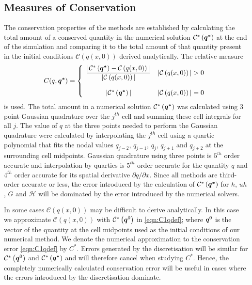 \subsection{Measures of Conservation}
The conservation properties of the methods are established by calculating the total amount of a conserved quantity in the numerical solution $\mathcal{C}^*\left({\boldsymbol{q^*}}\right)$ at the end of the simulation and comparing it to the total amount of that quantity present in the initial conditions $\mathcal{C}\left({q(x,0)} \right)$ derived analytically. The relative measure
\begin{equation}
C(q,\boldsymbol{q^*}) =  \left\lbrace \begin{array}{c r} 
\dfrac{|\mathcal{C}^*\left({\boldsymbol{q^*}}\right) - \mathcal{C}\left({q(x,0)} \right)| }{|\mathcal{C}\left({q(x,0)} \right)|} & |\mathcal{C}\left({q(x,0)} \right)| > 0 \\ \\
|\mathcal{C}^*\left({\boldsymbol{q^*}}\right)| & |\mathcal{C}\left({q(x,0)} \right)| = 0  \end{array}\right. 
\label{eqn:C1qdef} 
\end{equation}
is used. The total amount in a numerical solution $\mathcal{C}^*\left({\boldsymbol{q^*}}\right)$ was calculated using 3 point Gaussian quadrature over the $j^{th}$ cell and summing these cell integrals for all $j$. The value of $q$ at the three points needed to perform the Gaussian quadrature were calculated by interpolating the $j^{th}$ cell using a quartic polynomial that fits the nodal values $q_{j-2}$, $q_{j-1}$, $q_{j}$, $q_{j+1}$ and $q_{j+2}$ at the surrounding cell midpoints. Gaussian quadrature using three points is $5^{th}$ order accurate and interpolation by quartics is $5^{th}$ order accurate for the quantity $q$ and $4^{th}$ order accurate for its spatial derivative $\partial q / \partial x$. Since all methods are third-order accurate or less, the error introduced by the calculation of $\mathcal{C}^*\left({\boldsymbol{q^*}}\right)$ for $h$, $uh$, $G$ and $\mathcal{H}$ will be dominated by the error introduced by the numerical solvers.

In some cases $\mathcal{C}\left({q(x,0)} \right)$ may be difficult to derive analytically. In this case we approximate $\mathcal{C}\left({q(x,0)} \right)$ with $\mathcal{C}^*\left(\boldsymbol{q}^0\right)$ in \eqref{eqn:C1qdef}; where $\boldsymbol{q}^0$ is the vector of the quantity at the cell midpoints used as the initial conditions of our numerical method. We denote the numerical approximation to the conservation error \eqref{eqn:C1qdef} by $C^*$. Errors generated by the discretisation will be similar for $\mathcal{C}^*\left(\boldsymbol{q}^0\right)$ and $\mathcal{C}^*\left(\boldsymbol{q^*}\right)$ and will therefore cancel when studying $C^*$. Hence, the completely numerically calculated conservation error will be useful in cases where the errors introduced by the discretisation dominate.


